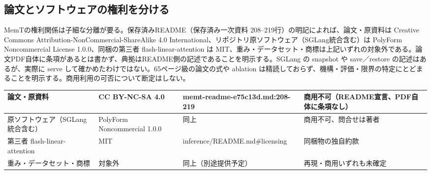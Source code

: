 \documentclass[lualatex,a4paper,10pt]{jlreq}
\begin{document}
\begin{multicols}{2} %


\subsection*{論文とソフトウェアの権利を分ける}


MemTの権利関係は子細な分離が要る。保存済みREADME（保存済み一次資料 208–219行）の明記によれば、論文・原資料は Creative Commons Attribution-NonCommercial-ShareAlike 4.0 International、リポジトリ原ソフトウェア（SGLang統合含む）は PolyForm Noncommercial License 1.0.0、同梱の第三者 flash-linear-attention は MIT、重み・データセット・商標は上記いずれの対象外である。論文PDF自体に条項があるとは書かず、典拠はREADME側の記述であることを明示する。SGLang の snapshot や save／restore の記述はあるが、実際に serve して確かめたわけではない。65ページ級の論文の式や ablation は精読しておらず、機構・評価・限界の特定にとどまることを明示する。商用利用の可否について断定はしない。


\end{multicols} %
{\centering\footnotesize
{}
\begin{tabularx}{0.96\linewidth}{@{}lXXX@{}}
\toprule
論文・原資料 & CC BY-NC-SA 4.0 & memt-readme-e75c13d.md:208-219 & 商用不可（README宣言、PDF自体に条項なし） \\
\midrule
原ソフトウェア（SGLang統合含む） & PolyForm Noncommercial 1.0.0 & 同上 & 商用不可、問合せは著者 \\
第三者 flash-linear-attention & MIT & inference/README.md\#licensing & 同梱物の独自約款 \\
重み・データセット・商標 & 対象外 & 同上（別途提供予定） & 再現・商用いずれも未確定 \\
\bottomrule
\end{tabularx}
} %
\end{document}
